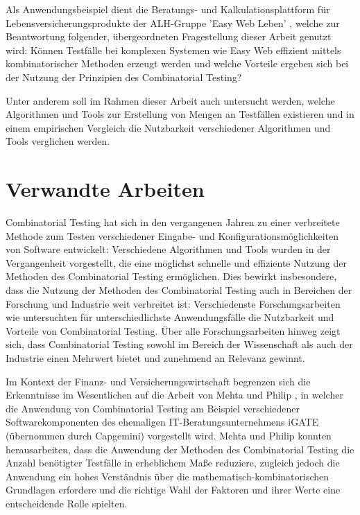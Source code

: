 Als Anwendungsbeispiel dient die Beratungs- und Kalkulationsplattform für Lebensversicherungsprodukte der ALH-Gruppe 'Easy Web Leben' \cite{easy_web}, welche zur Beantwortung folgender, übergeordneten Fragestellung dieser Arbeit genutzt wird: Können Testfälle bei komplexen Systemen wie Easy Web effizient mittels kombinatorischer Methoden erzeugt werden und welche Vorteile ergeben sich bei der Nutzung der Prinzipien des Combinatorial Testing? 

Unter anderem soll im Rahmen dieser Arbeit auch untersucht werden, welche Algorithmen und Tools zur Erstellung von Mengen an Testfällen existieren und in einem empirischen Vergleich die Nutzbarkeit verschiedener Algorithmen und Tools verglichen werden. 

\section{Verwandte Arbeiten}\label{sec:verwandteArbeiten}

Combinatorial Testing hat sich in den vergangenen Jahren zu einer verbreitete Methode zum Testen verschiedener Eingabe- und Konfigurationsmöglichkeiten von Software entwickelt: Verschiedene Algorithmen und Tools wurden in der Vergangenheit vorgestellt, die eine möglichst schnelle und effiziente Nutzung der Methoden des Combinatorial Testing ermöglichen. Dies bewirkt insbesondere, dass die Nutzung der Methoden des Combinatorial Testing auch in Bereichen der Forschung und Industrie weit verbreitet ist: Verschiedenste Forschungsarbeiten wie \cite{li2016applying,hagar2015introducing,smith2019measuring,ozcan2017applications,dhadyalla2014combinatorial,raunak2017combinatorial} untersuchten für unterschiedlichste Anwendungsfälle die Nutzbarkeit und Vorteile von Combinatorial Testing. Über alle Forschungsarbeiten hinweg zeigt sich, dass Combinatorial Testing sowohl im Bereich der Wissenschaft als auch der Industrie einen Mehrwert bietet und zunehmend an Relevanz gewinnt.

Im Kontext der Finanz- und Versicherungswirtschaft begrenzen sich die Erkenntnisse im Wesentlichen auf die Arbeit von Mehta und Philip \cite{mehta2013applications}, in welcher die Anwendung von Combinatorial Testing am Beispiel verschiedener Softwarekomponenten des ehemaligen IT-Beratungsunternehmens iGATE (übernommen durch Capgemini) vorgestellt wird. Mehta und Philip konnten herausarbeiten, dass die Anwendung der Methoden des Combinatorial Testing die Anzahl benötigter Testfälle in erheblichem Maße reduziere, zugleich jedoch die Anwendung ein hohes Verständnis über die mathematisch-kombinatorischen Grundlagen erfordere und die richtige Wahl der Faktoren und ihrer Werte eine entscheidende Rolle spielten. 

